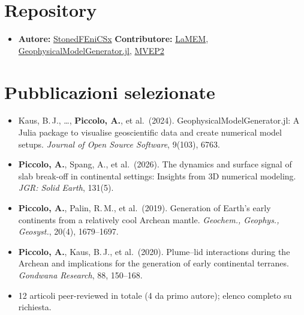 \documentclass[11pt,a4paper,sans]{moderncv}
\begin{document}

\section{Repository}
\vspace{1pt}
\begin{itemize}
\item \textbf{Autore:} \href{https://github.com/APiccolo89/StonedFenicsx}{StonedFEniCSx} \textbar{} \textbf{Contributore:} \href{https://github.com/UniMainzGeo/LaMEM}{LaMEM}, \href{https://github.com/JuliaGeodynamics/GeophysicalModelGenerator.jl}{GeophysicalModelGenerator.jl}, \href{https://bitbucket.org/bkaus/mvep2/}{MVEP2}
\end{itemize}

\section{Pubblicazioni selezionate}
\vspace{1pt}
{\small
\begin{itemize}
\item Kaus, B.\,J., \ldots, \textbf{Piccolo, A.}, et al.\ (2024). GeophysicalModelGenerator.jl: A Julia package to visualise geoscientific data and create numerical model setups. \textit{Journal of Open Source Software}, 9(103), 6763.
\item \textbf{Piccolo, A.}, Spang, A., et al.\ (2026). The dynamics and surface signal of slab break-off in continental settings: Insights from 3D numerical modeling. \textit{JGR: Solid Earth}, 131(5).
\item \textbf{Piccolo, A.}, Palin, R.\,M., et al.\ (2019). Generation of Earth's early continents from a relatively cool Archean mantle. \textit{Geochem., Geophys., Geosyst.}, 20(4), 1679--1697.
\item \textbf{Piccolo, A.}, Kaus, B.\,J., et al.\ (2020). Plume--lid interactions during the Archean and implications for the generation of early continental terranes. \textit{Gondwana Research}, 88, 150--168.
\item[] 12 articoli peer-reviewed in totale (4 da primo autore); elenco completo su richiesta.
\end{itemize}}

\end{document}
